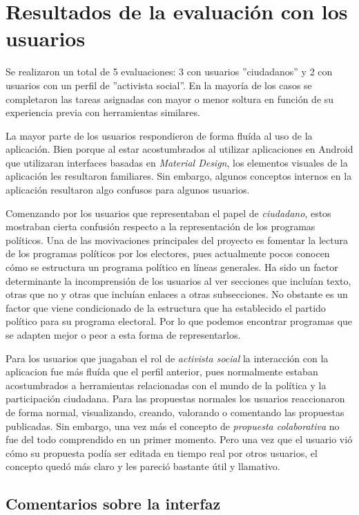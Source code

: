 \section{Resultados de la evaluación con los usuarios}

Se realizaron un total de 5 evaluaciones: 3 con usuarios ''ciudadanos'' y 2 con usuarios con un perfil de ''activista social''. En la mayoría de los casos se completaron las tareas asignadas con mayor o menor soltura en función de su experiencia previa con herramientas similares.

La mayor parte de los usuarios respondieron de forma fluída al uso de la aplicación. Bien porque al estar acostumbrados al utilizar aplicaciones en Android que utilizaran interfaces basadas en \textit{Material Design}, los elementos visuales de la aplicación les resultaron familiares. Sin embargo, algunos conceptos internos en la aplicación resultaron algo confusos para algunos usuarios.

Comenzando por los usuarios que representaban el papel de \textit{ciudadano}, estos mostraban cierta confusión respecto a la representación de los programas políticos. Una de las movivaciones principales del proyecto es fomentar la lectura de los programas políticos por los electores, pues actualmente pocos conocen cómo se estructura un programa político en líneas generales. Ha sido un factor determinante la incomprensión de los usuarios al ver secciones que incluían texto, otras que no y otras que incluían enlaces a otras subsecciones. No obstante es un factor que viene condicionado de la estructura que ha establecido el partido político para su programa electoral. Por lo que podemos encontrar programas que se adapten mejor o peor a esta forma de representarlos.

Para los usuarios que juagaban el rol de \textit{activista social} la interacción con la aplicacion fue más fluída que el perfil anterior, pues normalmente estaban acostumbrados a herramientas relacionadas con el mundo de la política y la participación ciudadana. Para las propuestas normales los usuarios reaccionaron de forma normal, visualizando, creando, valorando o comentando las propuestas publicadas. Sin embargo, una vez más el concepto de \textit{propuesta colaborativa} no fue del todo comprendido en un primer momento. Pero una vez que el usuario vió cómo su propuesta podía ser editada en tiempo real por otros usuarios, el concepto quedó más claro y les pareció bastante útil y llamativo.

\subsection{Comentarios sobre la interfaz}

